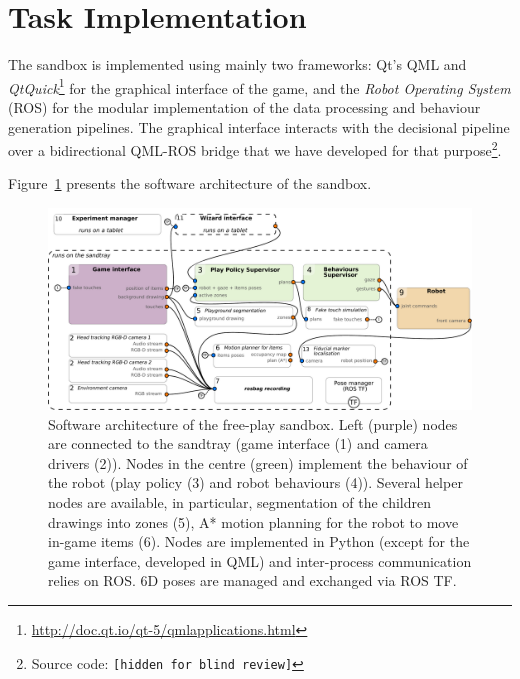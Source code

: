 \documentclass[sigconf]{acmart}
\begin{document}

\section{Task Implementation}
\label{sec:impl}

The sandbox is implemented using mainly two frameworks: Qt's QML and
\emph{QtQuick}\footnote{\url{http://doc.qt.io/qt-5/qmlapplications.html}}
for the graphical interface of the game, and the \emph{Robot Operating System}
(ROS) for the modular implementation of the data processing and behaviour
generation pipelines. The graphical interface interacts with the decisional
pipeline over a bidirectional QML-ROS bridge that we have developed for that
purpose\footnote{Source code: \texttt{[hidden for blind review]}}.


Figure~\ref{fig|architecture} presents the software architecture of the sandbox.

\begin{figure}
    \centering
    \includegraphics[width=\linewidth]{freeplay-sandbox-architecture}
    \caption{Software architecture of the free-play sandbox. Left (purple) nodes
    are connected to the sandtray (game interface (1) and camera drivers (2)). Nodes in the
    centre (green) implement the behaviour of the robot (play policy (3) and robot
    behaviours (4)). Several helper nodes are available, in particular, segmentation of the
    children drawings into zones (5), A* motion planning for the robot to move
    in-game items (6). Nodes are implemented in
    Python (except for the game interface, developed in QML) and inter-process
    communication relies on ROS. 6D poses are managed and exchanged via ROS TF.}

    \label{fig|architecture}
\end{figure}
\end{document}
